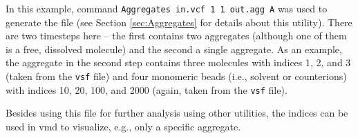 In this example, command \texttt{Aggregates in.vcf 1 1 out.agg A} was used
to generate the file (see Section \ref{sec:Aggregates} for details about
this utility). There are two timesteps here -- the first contains two
aggregates (although one of them is a free, dissolved molecule) and the
second a single aggregate.  As an example, the aggregate in the second step
contains three molecules with indices 1, 2, and 3 (taken from the
\texttt{vsf} file) and four monomeric beads (i.e., solvent or counterions)
with indices 10, 20, 100, and 2000 (again, taken from the \texttt{vsf}
file).

Besides using this file for further analysis using other utilities, the
indices can be used in vmd to visualize, e.g., only a specific aggregate.

